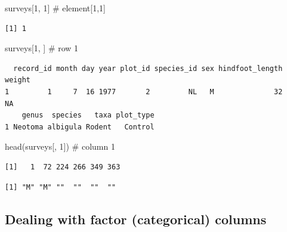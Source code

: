 \documentclass[
  letterpaper,
  DIV=11,
  numbers=noendperiod]{scrreprt}
\newenvironment{Shaded}{\begin{snugshade}}{\end{snugshade}}
\newcommand{\CommentTok}[1]{\textcolor[rgb]{0.37,0.37,0.37}{#1}}
\newcommand{\DecValTok}[1]{\textcolor[rgb]{0.68,0.00,0.00}{#1}}
\newcommand{\FunctionTok}[1]{\textcolor[rgb]{0.28,0.35,0.67}{#1}}
\newcommand{\NormalTok}[1]{\textcolor[rgb]{0.00,0.23,0.31}{#1}}
\newcommand{\SpecialCharTok}[1]{\textcolor[rgb]{0.37,0.37,0.37}{#1}}
\begin{document}
\begin{Shaded}
\begin{Highlighting}[]
\NormalTok{surveys[}\DecValTok{1}\NormalTok{, }\DecValTok{1}\NormalTok{] }\CommentTok{\# element[1,1]}
\end{Highlighting}
\end{Shaded}

\begin{verbatim}
[1] 1
\end{verbatim}

\begin{Shaded}
\begin{Highlighting}[]
\NormalTok{surveys[}\DecValTok{1}\NormalTok{, ] }\CommentTok{\# row 1}
\end{Highlighting}
\end{Shaded}

\begin{verbatim}
  record_id month day year plot_id species_id sex hindfoot_length weight
1         1     7  16 1977       2         NL   M              32     NA
    genus  species   taxa plot_type
1 Neotoma albigula Rodent   Control
\end{verbatim}

\begin{Shaded}
\begin{Highlighting}[]
\FunctionTok{head}\NormalTok{(surveys[, }\DecValTok{1}\NormalTok{]) }\CommentTok{\# column 1}
\end{Highlighting}
\end{Shaded}

\begin{verbatim}
[1]   1  72 224 266 349 363
\end{verbatim}

\begin{Shaded}
\end{Shaded}

\begin{verbatim}
[1] "M" "M" ""  ""  ""  "" 
\end{verbatim}

\subsection{Dealing with factor (categorical)
columns}\label{dealing-with-factor-categorical-columns}
\end{document}
